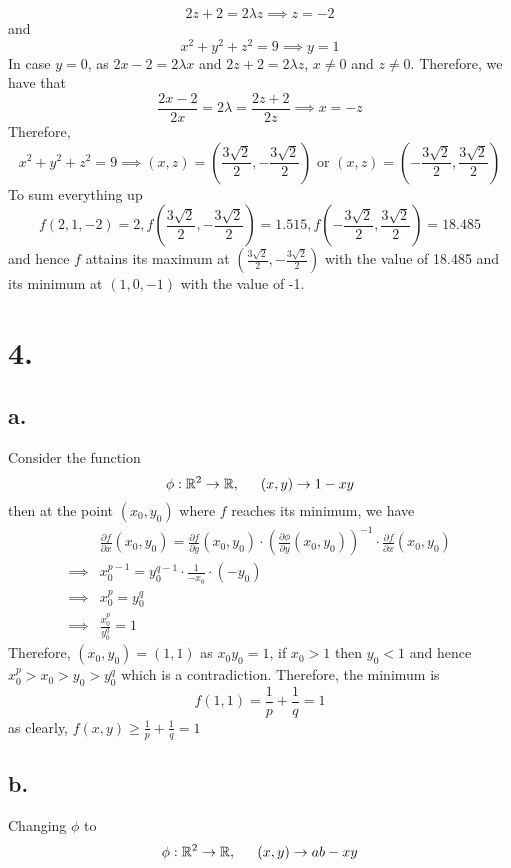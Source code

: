 \documentclass[11pt]{article}
\begin{document}
\[
    2z+2 = 2\lambda z \implies z = -2
\]
and 
\[
    x^2+y^2+z^2 = 9 \implies y = 1
\]
In case $y=0$, as $2x-2=2\lambda x$ and $2z+2 = 2\lambda z$, $x\ne 0$ and $z\ne 0$. Therefore, we have that
\[
    \frac{2x-2}{2x} = 2\lambda = \frac{2z+2}{2z} \implies x = -z    
\]
Therefore, 
\[
    x^2+y^2+z^2=9 \implies (x,z) = \left(\frac{3\sqrt{2}}{2},-\frac{3\sqrt{2}}{2}\right) \text{ or } (x,z) = \left(-\frac{3\sqrt{2}}{2},\frac{3\sqrt{2}}{2}\right)    
\]
To sum everything up 
\[
    f(2,1,-2) = 2, f\left(\frac{3\sqrt{2}}{2},-\frac{3\sqrt{2}}{2}\right) = 1.515, f\left(-\frac{3\sqrt{2}}{2},\frac{3\sqrt{2}}{2}\right) = 18.485 
\]
and hence $f$ attains its maximum at $\left(\frac{3\sqrt{2}}{2},-\frac{3\sqrt{2}}{2}\right)$ with the value of 18.485
and its minimum at $(1,0,-1)$ with the value of -1.
\pagebreak
\section*{4.}
\subsection*{a.}
Consider the function
\[
    \phi: \mathbb{R}^2 \to \mathbb{R}, \indent (x,y) \to 1-xy    
\]
then at the point $(x_0, y_0)$ where $f$ reaches its minimum, we have
\begin{equation*}
    \begin{aligned}
        &\frac{\partial f}{\partial x}(x_0,y_0) = \frac{\partial f}{\partial y} (x_0,y_0) \cdot \left( \frac{\partial \phi}{\partial y}(x_0,y_0) \right)^{-1} \cdot \frac{\partial f}{ \partial x} (x_0,y_0) \\  
        \implies & x_0^{p-1} = y_0^{q-1} \cdot \frac{1}{-x_0} \cdot (-y_0) \\ 
        \implies & x_0^p = y_0^q \\
        \implies & \frac{x_0^p}{y_0^q} = 1
    \end{aligned}
\end{equation*}
Therefore, $(x_0,y_0) = (1,1)$
as $x_0y_0 = 1$, if $x_0>1$ then $y_0<1$ 
and hence $x_0^p > x_0 > y_0 > y_0^q$ which is a contradiction.
Therefore, the minimum is 
\[
    f(1,1) = \frac{1}{p}+ \frac{1}{q} = 1
\]
as clearly, $f(x,y) \ge \frac{1}{p}+\frac{1}{q} = 1$
\subsection*{b.}
Changing $\phi$ to
\[
    \phi: \mathbb{R}^2 \to \mathbb{R}, \indent (x,y) \to ab-xy    
\]
\end{document}
